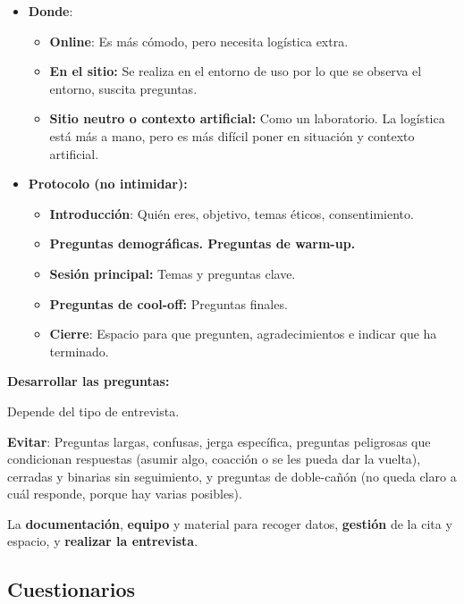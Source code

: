 \documentclass[12pt, twoside, openright]{report} %
\begin{document}
\begin{itemize}
	\item \textbf{Donde}:

	      \begin{itemize}
		      \item \textbf{Online}: Es más cómodo, pero necesita logística extra.
		      \item \textbf{En el sitio:} Se realiza en el entorno de uso por lo que
		            se observa el entorno, suscita preguntas.
		      \item \textbf{Sitio neutro o contexto artificial:} Como un laboratorio.
		            La logística está más a mano, pero es más difícil poner en
		            situación y contexto artificial.
	      \end{itemize}
	\item \textbf{Protocolo (no intimidar):}

	      \begin{itemize}
		      \item \textbf{Introducción}: Quién eres, objetivo, temas éticos,
		            consentimiento.
		      \item \textbf{Preguntas demográficas. Preguntas de warm-up.}
		      \item \textbf{Sesión principal:} Temas y preguntas clave.
		      \item \textbf{Preguntas de cool-off:} Preguntas finales.
		      \item \textbf{Cierre}: Espacio para que pregunten, agradecimientos e indicar que ha terminado.
	      \end{itemize}
\end{itemize}

\textbf{Desarrollar las preguntas:}

Depende del tipo de entrevista.

\textbf{Evitar}: Preguntas largas, confusas, jerga específica, preguntas
peligrosas que condicionan respuestas (asumir algo, coacción o se les
pueda dar la vuelta), cerradas y binarias sin seguimiento, y preguntas
de doble-cañón (no queda claro a cuál responde, porque hay varias
posibles).

La \textbf{documentación}, \textbf{equipo} y material para recoger
datos, \textbf{gestión} de la cita y espacio, y \textbf{realizar la
	entrevista}.

\subsection{Cuestionarios}
\end{document}
